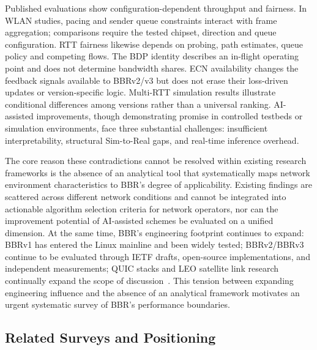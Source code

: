 \documentclass[a4paper,fleqn]{cas-sc}
\begin{document}
Published evaluations show configuration-dependent throughput and fairness.
In WLAN studies, pacing and sender queue constraints interact with frame
aggregation; comparisons require the tested chipset, direction and queue
configuration. RTT fairness likewise depends on probing, path estimates,
queue policy and competing flows. The BDP identity describes an in-flight
operating point and does not determine bandwidth shares. ECN availability
changes the feedback signals available to BBRv2/v3 but does not erase their
loss-driven updates or version-specific logic. Multi-RTT simulation results
illustrate conditional differences among versions rather than a universal
ranking\citep{rfc3168,rfc9330,rfc9331,rfc9332,piotrowska2024}. AI-assisted improvements, though demonstrating promise in controlled testbeds
or simulation environments, face three substantial challenges: insufficient
interpretability, structural Sim-to-Real gaps, and real-time inference overhead.

The core reason these contradictions cannot be resolved within existing research
frameworks is the absence of an analytical tool that systematically maps network
environment characteristics to BBR's degree of applicability. Existing findings
are scattered across different network conditions and cannot be integrated into
actionable algorithm selection criteria for network operators, nor can the
improvement potential of AI-assisted schemes be evaluated on a unified dimension.
At the same time, BBR's engineering footprint continues to expand: BBRv1 has
entered the Linux mainline and been widely tested; BBRv2/BBRv3 continue to be
evaluated through IETF drafts, open-source implementations, and independent
measurements; QUIC stacks and LEO satellite link research continually expand the
scope of discussion~\citep{cardwell2017bbr,cardwell2019bbrv2,ietf_ccwg_bbr,abrol2026bbr,zeynali2024bbrv3}.
This tension between expanding engineering influence and the absence of an
analytical framework motivates an urgent systematic survey of BBR's performance
boundaries.

\subsection{Related Surveys and Positioning}
\label{sec:related}
\end{document}

